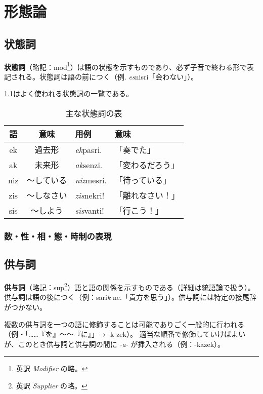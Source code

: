 \chapter{形態論}

\section{状態詞}

\textbf{状態詞}（略記：mod\footnote{英訳 \emph{Modifier} の略。}）は語の状態を示すものであり、必ず子音で終わる形で表記される。状態詞は語の前につく（例. \emph{es}nisri「会わない」）。

\cref{table:common-mods}はよく使われる状態詞の一覧である。

\begin{table}[H]
    \centering
    \caption{主な状態詞の表}
    \label{table:common-mods}
    \begin{tabular}{ccll}
        \toprule
        語 & 意味 & 用例 & 意味 \\
        \midrule
        ek  & 過去形 & \emph{ek}pasri. & 「奏でた」\\
        ak  & 未来形 & \emph{ak}senzi. & 「変わるだろう」 \\
        niz & ～している & \emph{niz}mesri. & 「待っている」 \\
        zis & ～しなさい & \emph{zis}nekri! & 「離れなさい！」\\
        sis & ～しよう & \emph{sis}vanti! & 「行こう！」\\
        \bottomrule
    \end{tabular}
\end{table}

\subsection{数・性・相・態・時制の表現}


\section{供与詞}

\textbf{供与詞}（略記：sup\footnote{英訳 \emph{Supplier} の略。}）語と語の関係を示すものである（詳細は統語論で扱う）。供与詞は語の後につく（例：sari\emph{k} ne.「貴方を思う」）。供与詞には特定の接尾辞がつかない。

複数の供与詞を一つの語に修飾することは可能でありごく一般的に行われる（例・「……『を』～～『に』」→ -k-zek）。
適当な順番で修飾していけばよいが、このとき供与詞と供与詞の間に \emph{-a-} が挿入される（例：-kazek）。

